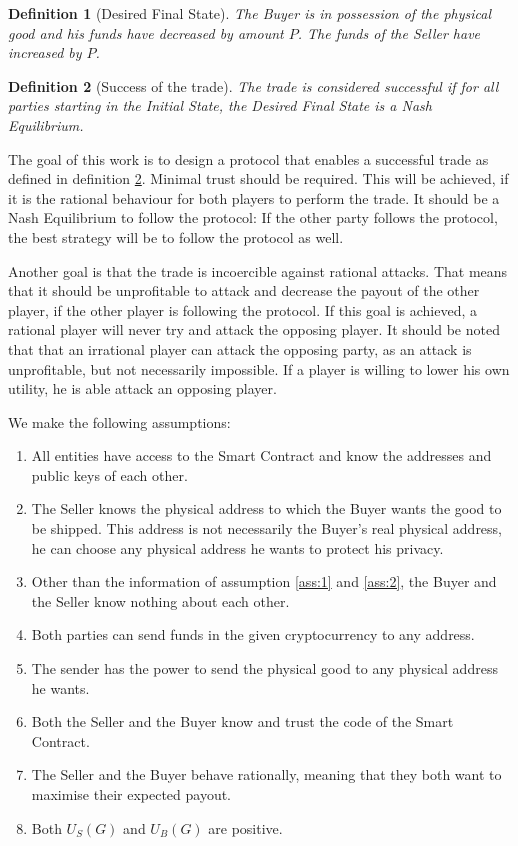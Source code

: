 \documentclass{cacthesis}
\newtheorem{definition}{Definition}
\begin{document}
\begin{definition}[Desired Final State]
\label{def:desired-final-state}
The Buyer is in possession of the physical good and his funds have decreased by amount $P$. The funds of the Seller have increased by $P$.
\end{definition}

\begin{definition}[Success of the trade]
\label{def:success-trade}
The trade is considered successful if for all parties starting in the Initial State, the Desired Final State is a Nash Equilibrium.
\end{definition}

\label{sec:goal}
The goal of this work is to design a protocol that enables a successful trade as defined in definition \ref{def:success-trade}. Minimal trust should be required. This will be achieved, if it is the rational behaviour for both players to perform the trade. It should be a Nash Equilibrium to follow the protocol: If the other party follows the protocol, the best strategy will be to follow the protocol as well.\newline

Another goal is that the trade is incoercible against rational attacks. That means that it should be unprofitable to attack and decrease the payout of the other player, if the other player is following the protocol. If this goal is achieved, a rational player will never try and attack the opposing player. It should be noted that that an irrational player can attack the opposing party, as an attack is unprofitable, but not necessarily impossible. If a player is willing to lower his own utility, he is able attack an opposing player. \newline

We make the following assumptions:
\begin{enumerate}
    \item All entities have access to the Smart Contract and know the addresses and public keys of each other.
    \label{ass:1}
    \item The Seller knows the physical address to which the Buyer wants the good to be shipped. This address is not necessarily the Buyer's real physical address, he can choose any physical address he wants to protect his privacy.
    \label{ass:2}
    \item Other than the information of assumption \ref{ass:1} and \ref{ass:2}, the Buyer and the Seller know nothing about each other.
    \label{ass:3}
    \item Both parties can send funds in the given cryptocurrency to any address.
    \label{ass:4}
    \item The sender has the power to send the physical good to any physical address he wants.
    \label{ass:5}
    \item Both the Seller and the Buyer know and trust the code of the Smart Contract.
    \label{ass:6}
    \item The Seller and the Buyer behave rationally, meaning that they both want to maximise their expected payout.
    \item Both $U_S(G)$ and $U_B(G)$ are positive. 
\end{enumerate}
\end{document}
